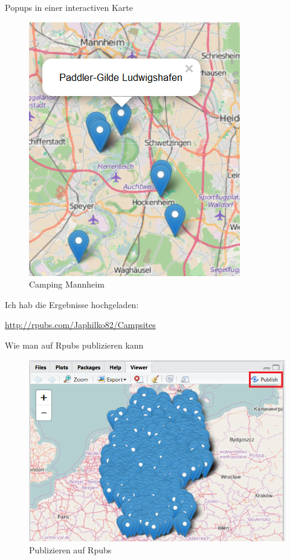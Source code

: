 \documentclass[ignorenonframetext,]{beamer}
\begin{document}
\begin{frame}{Popups in einer interactiven Karte}

\begin{figure}
\centering
\includegraphics{figure/Camping_Mannheim.PNG}
\caption{Camping Mannheim}
\end{figure}

Ich hab die Ergebnisse hochgeladen:

\url{http://rpubs.com/Japhilko82/Campsites}

\end{frame}

\begin{frame}{Wie man auf Rpubs publizieren kann}

\begin{figure}
\centering
\includegraphics{figure/PublishCampSitesGermany.PNG}
\caption{Publizieren auf Rpubs}
\end{figure}

\end{frame}
\end{document}
